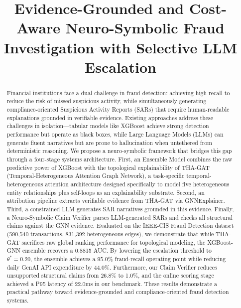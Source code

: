 \documentclass[journal]{IEEEtran}
\begin{document}
\title{Evidence-Grounded and Cost-Aware Neuro-Symbolic Fraud Investigation with Selective LLM Escalation}

\author{
}

\maketitle

\begin{abstract}
Financial institutions face a dual challenge in fraud detection: achieving high recall to reduce the risk of missed suspicious activity, while simultaneously generating compliance-oriented Suspicious Activity Reports (SARs) that require human-readable explanations grounded in verifiable evidence. Existing approaches address these challenges in isolation---tabular models like XGBoost achieve strong detection performance but operate as black boxes, while Large Language Models (LLMs) can generate fluent narratives but are prone to hallucination when untethered from deterministic reasoning. We propose a neuro-symbolic framework that bridges this gap through a four-stage systems architecture. First, an Ensemble Model combines the raw predictive power of XGBoost with the topological explainability of THA-GAT (Temporal-Heterogeneous Attention Graph Network), a task-specific temporal-heterogeneous attention architecture designed specifically to model five heterogeneous entity relationships plus self-loops as an explainability substrate. Second, an attribution pipeline extracts verifiable evidence from THA-GAT via GNNExplainer. Third, a constrained LLM generates SAR narratives grounded in this evidence. Finally, a Neuro-Symbolic Claim Verifier parses LLM-generated SARs and checks all structural claims against the GNN evidence. Evaluated on the IEEE-CIS Fraud Detection dataset (590,540 transactions, 831,392 heterogeneous edges), we demonstrate that while THA-GAT sacrifices raw global ranking performance for topological modeling, the XGBoost-GNN ensemble recovers a 0.8815 AUC. By lowering the escalation threshold to $\theta^* = 0.20$, the ensemble achieves a $95.0\%$ fraud-recall operating point while reducing daily GenAI API expenditure by 44.0\%. Furthermore, our Claim Verifier reduces unsupported structural claims from 26.8\% to 1.0\%, and the online scoring stage achieved a P95 latency of 22.0ms in our benchmark. These results demonstrate a practical pathway toward evidence-grounded and compliance-oriented fraud detection systems.
\end{abstract}
\end{document}
